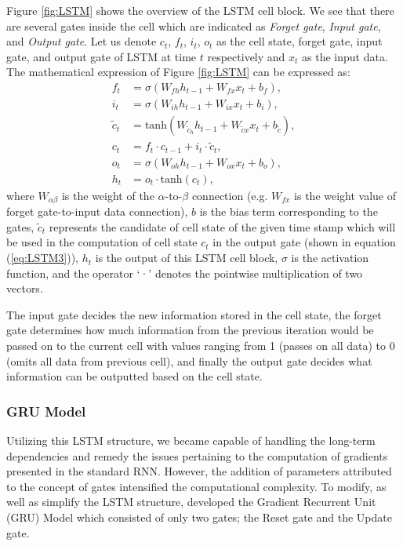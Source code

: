 Figure \ref{fig:LSTM} shows the overview of the LSTM cell block. We see that there are several gates inside the cell which are indicated as \textit{Forget gate}, \textit{Input gate}, and \textit{Output gate}. Let us denote $c_{t}$, $f_{t}$, $i_{t}$, $o_{t}$ as the cell state, forget gate, input gate, and output gate of LSTM at time $t$ respectively and $x_{t}$ as the input data. The mathematical expression of Figure \ref{fig:LSTM} can be expressed as:
\begin{align}
    f_{t} &= \sigma(W_{fh}h_{t-1} + W_{fx}x_{t} + b_{f}),\label{eq:LSTM1}\\
    i_{t} &= \sigma(W_{ih}h_{t-1} + W_{ix}x_{t} + b_{i}),\label{eq:LSTM2}\\
    \tilde{c}_{t} &= \mathrm{tanh}(W_{\tilde{c}_h}h_{t-1} + W_{\tilde{c}x}x_{t} + b_{\tilde{c}}),\label{eq:LSTM3}\\
    c_{t} &= f_{t}\cdot c_{t-1} + i_{t} \cdot \tilde{c}_{t},\label{eq:LSTM4}\\
    o_{t} &= \sigma(W_{oh}h_{t-1} + W_{ox}x_{t} + b_{o}),\label{eq:LSTM5}\\
    h_{t} &= o_{t} \cdot \mathrm{tanh}(c_{t}),\label{eq:LSTM6}
\end{align}
where $W_{\alpha \beta}$ is the weight of the $\alpha$-to-$\beta$  connection (e.g. $W_{f x}$ is the weight value of forget gate-to-input data connection), $b$ is the bias term corresponding to the gates, $\tilde{c}_{t}$ represents the candidate of cell state of the given time stamp which will be used in the computation of cell state $c_{t}$ in the output gate (shown in equation (\ref{eq:LSTM3})), $h_{t}$ is the output of this LSTM cell block, $\sigma$ is the activation function, and the operator ‘·’ denotes the pointwise multiplication of two vectors. 

The input gate decides the new information stored in the cell state, the forget gate determines how much information from the previous iteration would be passed on to the current cell with values ranging from 1 (passes on all data) to 0 (omits all data from previous cell), and finally the output gate decides what information can be outputted based on the cell state.  

\subsubsection{GRU Model}
Utilizing this LSTM structure, we became capable of handling the long-term dependencies and remedy the issues pertaining to the computation of gradients presented in the standard RNN. However, the addition of parameters attributed to the concept of gates intensified the computational complexity. To modify, as well as simplify the LSTM structure, \citet{GRU} developed the Gradient Recurrent Unit (GRU) Model which consisted of only two gates; the Reset gate and the Update gate. 


